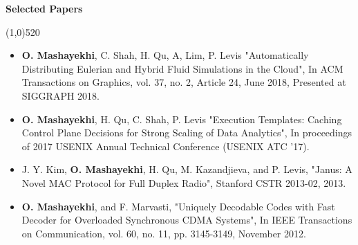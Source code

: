 \documentclass[letterpaper,10pt]{article}
\newcommand{\heading}[1] {
  {\large
    \begin{minipage}
    {\textwidth}
    {\textbf{#1}}
    \end{minipage}
  }
  \begin{center}
  \vspace{-15pt}
  \line(1,0){520}
  \end{center}
}
\begin{document}
\vspace{5pt}




\heading{Selected Papers}

\begin{itemize}[noitemsep,topsep=0pt, leftmargin=.5cm, rightmargin=.5cm]

\item[]
\textbf{O. Mashayekhi}, C. Shah, H. Qu, A, Lim, P. Levis
"Automatically Distributing Eulerian and Hybrid Fluid Simulations in the Cloud",
In ACM Transactions on Graphics, vol. 37, no. 2, Article 24, June 2018, Presented at SIGGRAPH 2018.

\vspace{5pt}

\item[]
\textbf{O. Mashayekhi}, H. Qu, C. Shah, P. Levis
"Execution Templates: Caching Control Plane Decisions for Strong Scaling of Data Analytics",
In proceedings of 2017 USENIX Annual Technical Conference (USENIX ATC '17).

\vspace{5pt}



\item[]
J. Y. Kim, \textbf{O. Mashayekhi}, H. Qu, M. Kazandjieva, and P. Levis,
"Janus: A Novel MAC Protocol for Full Duplex Radio",
Stanford CSTR 2013-02, 2013.

\vspace{5pt}

\item[]
\textbf{O. Mashayekhi}, and F. Marvasti,
"Uniquely Decodable Codes with Fast Decoder for Overloaded Synchronous CDMA Systems",
In IEEE Transactions on Communication, vol. 60, no. 11, pp. 3145-3149, November 2012.

\end{itemize}

\vspace{5pt}
\end{document}
